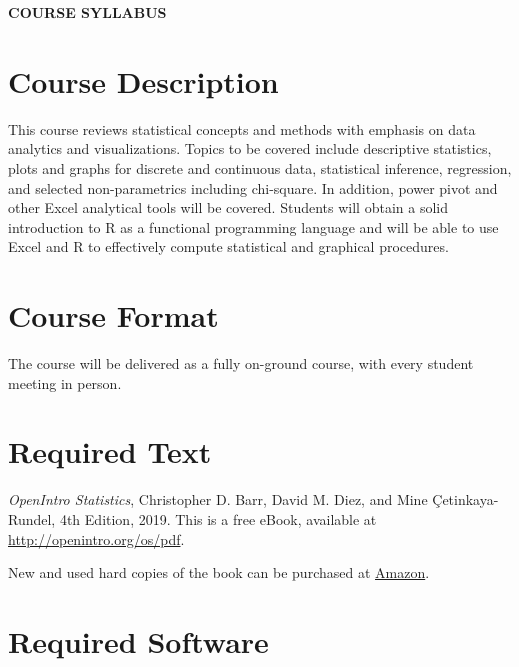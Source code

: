 \documentclass[11pt,]{article}
\begin{document}
\vspace{2mm}

\begin{center}
\textbf{\Large{\textcolor{unhtext}{COURSE SYLLABUS}}}
\end{center}
   
\hypertarget{course-description}{%
\section{Course Description}\label{course-description}}

This course reviews statistical concepts and methods with emphasis on
data analytics and visualizations. Topics to be covered include
descriptive statistics, plots and graphs for discrete and continuous
data, statistical inference, regression, and selected non-parametrics
including chi-square. In addition, power pivot and other Excel
analytical tools will be covered. Students will obtain a solid
introduction to R as a functional programming language and will be able
to use Excel and R to effectively compute statistical and graphical
procedures.

\hypertarget{course-format}{%
\section{Course Format}\label{course-format}}

The course will be delivered as a fully on-ground course, with every
student meeting in person.

\hypertarget{required-text}{%
\section{Required Text}\label{required-text}}

\emph{OpenIntro Statistics}, Christopher D. Barr, David M. Diez, and
Mine Çetinkaya-Rundel, 4th Edition, 2019. This is a free eBook,
available at \url{http://openintro.org/os/pdf}.

New and used hard copies of the book can be purchased at
\href{https://www.amazon.com/OpenIntro-Statistics-Fourth-color-interior/dp/1943450226/ref=sr_1_1?crid=XKV3CDPZPZDG\&keywords=OpenIntro+Statistics\&qid=1692970332\&sprefix=openintro+statistics\%2Caps\%2C84\&sr=8-1}{Amazon}.

\hypertarget{required-software}{%
\section{Required Software}\label{required-software}}
\end{document}
